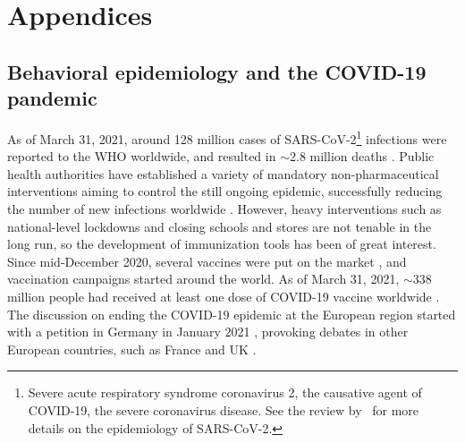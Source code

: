 \renewcommand\setthesection{\Alph{section}} 

\chapter*{Appendices}


\section{Behavioral epidemiology and the COVID-19 pandemic}
\label{BehavEpiCOVID}
%


As of March 31, 2021, around 128 million cases of SARS-CoV-2\footnote{Severe acute respiratory syndrome coronavirus 2, the causative agent of COVID-19, the severe coronavirus disease. See the review by~\cite{Salzberger2020} for more details on the epidemiology of SARS-CoV-2.} infections were reported to the WHO worldwide, and resulted in $\sim2.8$ million deaths \cite[]{WHO_CovidDashboard}. Public health authorities have established a variety of mandatory non-pharmaceutical interventions aiming to control the still ongoing epidemic, successfully reducing the number of new infections worldwide \cite[]{Bo2021}. However, heavy interventions such as national-level lockdowns and closing schools and stores are not tenable in the long run, so the development of immunization tools has been of great interest. Since mid-December 2020, several vaccines were put on the market \cite[]{WHO_CovidVaccines}, and vaccination campaigns started around the world. As of March 31, 2021, $\sim338$ million people had received at least one dose of COVID-19 vaccine worldwide \cite[]{OWID_CovidVaccination}. The discussion on ending the COVID-19 epidemic at the European region started with a petition in Germany in January 2021 \cite[]{ZeroCovid_EU}, provoking debates in other European countries, such as France \cite[]{ZeroCovid_FR} and UK \cite[]{ZeroCovid_UK}. 

